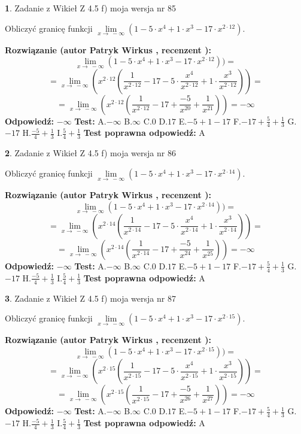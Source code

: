 \documentclass[12pt, a4paper]{article}
\theoremstyle{definition} %
\newtheorem{zad}{}
\newcommand{\zadStart}[1]{\begin{zad}#1\newline}
\newcommand{\zadStop}{\end{zad}}
\newcommand{\rozwStart}[2]{\noindent \textbf{Rozwiązanie (autor #1 , recenzent #2): }\newline}
\newcommand{\rozwStop}{\newline}
\newcommand{\odpStart}{\noindent \textbf{Odpowiedź:}\newline}
\newcommand{\odpStop}{\newline}
\newcommand{\testStart}{\noindent \textbf{Test:}\newline}
\newcommand{\testStop}{\newline}
\newcommand{\kluczStart}{\noindent \textbf{Test poprawna odpowiedź:}\newline}
\newcommand{\kluczStop}{\newline}
\begin{document}
\zadStart{Zadanie z Wikieł Z 4.5 f) moja wersja nr 85}



Obliczyć granicę funkcji  $\lim\limits_{x\to\ -\infty}(1 - 5 \cdot x^{4}+1 \cdot x^{3}- 17 \cdot x^{2\cdot12})$.
\zadStop
\rozwStart{Patryk Wirkus}{}
$$\lim\limits_{x\to\ -\infty}(1 - 5 \cdot x^{4}+1 \cdot x^{3}- 17 \cdot x^{2\cdot12}))=$$
$$=\lim\limits_{x\to\ -\infty}(x^{2\cdot12}(\frac{1}{x^{2\cdot12}}-17 -5 \cdot \frac{x^{4}}{x^{2\cdot12}}+1 \cdot \frac{x^{3}}{x^{2\cdot12}}))=$$
$$=\lim\limits_{x\to\ -\infty}(x^{2\cdot12}(\frac{1}{x^{2\cdot12}}-17 + \frac{-5}{x^{20}}+ \frac{1}{x^{21}}))=-\infty$$
\rozwStop
\odpStart
$-\infty$
\odpStop
\testStart
A.$-\infty$ B.$\infty$ C.$0$ D.$17$ E.$-5 + 1 - 17$
F.$-17+\frac{5}{4}+\frac{1}{3}$ G.$-17$
H.$\frac{-5}{4}+\frac{1}{3}$
I.$\frac{5}{4}+\frac{1}{3}$
\testStop
\kluczStart
A
\kluczStop



\zadStart{Zadanie z Wikieł Z 4.5 f) moja wersja nr 86}



Obliczyć granicę funkcji  $\lim\limits_{x\to\ -\infty}(1 - 5 \cdot x^{4}+1 \cdot x^{3}- 17 \cdot x^{2\cdot14})$.
\zadStop
\rozwStart{Patryk Wirkus}{}
$$\lim\limits_{x\to\ -\infty}(1 - 5 \cdot x^{4}+1 \cdot x^{3}- 17 \cdot x^{2\cdot14}))=$$
$$=\lim\limits_{x\to\ -\infty}(x^{2\cdot14}(\frac{1}{x^{2\cdot14}}-17 -5 \cdot \frac{x^{4}}{x^{2\cdot14}}+1 \cdot \frac{x^{3}}{x^{2\cdot14}}))=$$
$$=\lim\limits_{x\to\ -\infty}(x^{2\cdot14}(\frac{1}{x^{2\cdot14}}-17 + \frac{-5}{x^{24}}+ \frac{1}{x^{25}}))=-\infty$$
\rozwStop
\odpStart
$-\infty$
\odpStop
\testStart
A.$-\infty$ B.$\infty$ C.$0$ D.$17$ E.$-5 + 1 - 17$
F.$-17+\frac{5}{4}+\frac{1}{3}$ G.$-17$
H.$\frac{-5}{4}+\frac{1}{3}$
I.$\frac{5}{4}+\frac{1}{3}$
\testStop
\kluczStart
A
\kluczStop



\zadStart{Zadanie z Wikieł Z 4.5 f) moja wersja nr 87}



Obliczyć granicę funkcji  $\lim\limits_{x\to\ -\infty}(1 - 5 \cdot x^{4}+1 \cdot x^{3}- 17 \cdot x^{2\cdot15})$.
\zadStop
\rozwStart{Patryk Wirkus}{}
$$\lim\limits_{x\to\ -\infty}(1 - 5 \cdot x^{4}+1 \cdot x^{3}- 17 \cdot x^{2\cdot15}))=$$
$$=\lim\limits_{x\to\ -\infty}(x^{2\cdot15}(\frac{1}{x^{2\cdot15}}-17 -5 \cdot \frac{x^{4}}{x^{2\cdot15}}+1 \cdot \frac{x^{3}}{x^{2\cdot15}}))=$$
$$=\lim\limits_{x\to\ -\infty}(x^{2\cdot15}(\frac{1}{x^{2\cdot15}}-17 + \frac{-5}{x^{26}}+ \frac{1}{x^{27}}))=-\infty$$
\rozwStop
\odpStart
$-\infty$
\odpStop
\testStart
A.$-\infty$ B.$\infty$ C.$0$ D.$17$ E.$-5 + 1 - 17$
F.$-17+\frac{5}{4}+\frac{1}{3}$ G.$-17$
H.$\frac{-5}{4}+\frac{1}{3}$
I.$\frac{5}{4}+\frac{1}{3}$
\testStop
\kluczStart
A
\kluczStop
\end{document}
